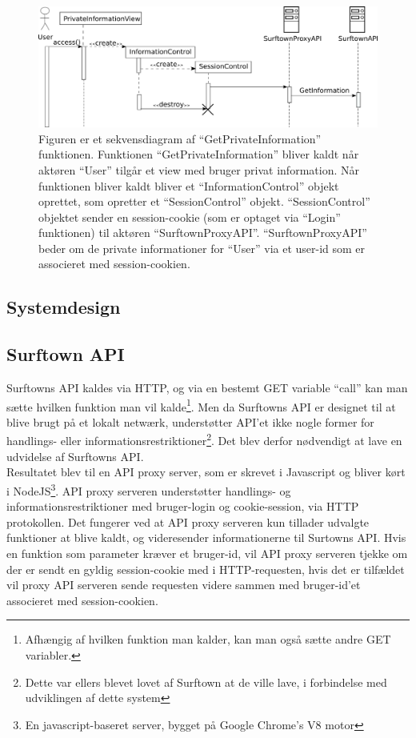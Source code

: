 \documentclass[12pt]{article}
\begin{document}
\begin{figure}
	\centering
	\includegraphics[width=13cm]{sekvens_diagrammer/GetPrivateInformation.png}
	\caption{Figuren er et sekvensdiagram af ``GetPrivateInformation'' funktionen. Funktionen ``GetPrivateInformation'' bliver kaldt når aktøren ``User'' tilgår et view med bruger privat information. Når funktionen bliver kaldt bliver et ``InformationControl'' objekt oprettet, som opretter et ``SessionControl'' objekt. ``SessionControl'' objektet sender en session-cookie (som er optaget via ``Login'' funktionen) til aktøren ``SurftownProxyAPI''. ``SurftownProxyAPI'' beder om de private informationer for ``User'' via et user-id som er associeret med session-cookien.}
	\label{fig:GetPrivateInformation}
\end{figure}
\newpage
\subsection{Systemdesign}
\subsection*{Surftown API}
Surftowns API kaldes via HTTP, og via en bestemt GET variable ``call'' kan man sætte hvilken funktion man vil kalde\footnote{Afhængig af hvilken funktion man kalder, kan man også sætte andre GET variabler.}. 
Men da Surftowns API er designet til at blive brugt på et lokalt netwærk, understøtter API'et ikke nogle former for handlings- eller informationsrestriktioner\footnote{Dette var ellers blevet lovet af Surftown at de ville lave, i forbindelse med udviklingen af dette system}. Det blev derfor nødvendigt at lave en udvidelse af Surftowns API.\\
Resultatet blev til en API proxy server, som er skrevet i Javascript og bliver kørt i NodeJS\footnote{En javascript-baseret server, bygget på Google Chrome's V8 motor}. API proxy serveren understøtter handlings- og informationsrestriktioner med bruger-login og cookie-session, via HTTP protokollen. Det fungerer ved at API proxy serveren kun tillader udvalgte funktioner at blive kaldt, og videresender informationerne til Surtowns API. Hvis en funktion som parameter kræver et bruger-id, vil API proxy serveren tjekke om der er sendt en gyldig session-cookie med i HTTP-requesten, hvis det er tilfældet vil proxy API serveren sende requesten videre sammen med bruger-id'et associeret med session-cookien.
\end{document}
